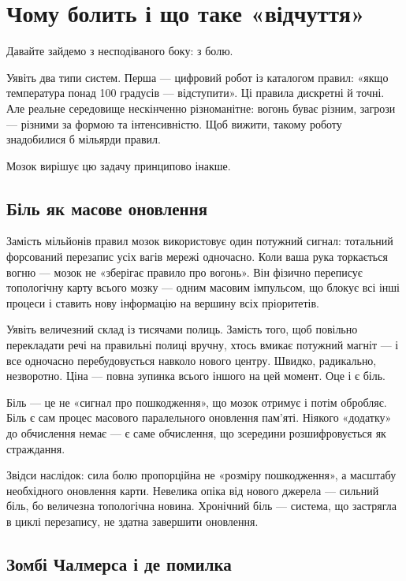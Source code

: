 \documentclass[12pt, a4paper, openany]{book}
\begin{document}
\chapter{Чому болить і що таке «відчуття»}

Давайте зайдемо з несподіваного боку: з болю.

Уявіть два типи систем. Перша --- цифровий робот із каталогом правил: «якщо температура понад 100 градусів --- відступити». Ці правила дискретні й точні. Але реальне середовище нескінченно різноманітне: вогонь буває різним, загрози --- різними за формою та інтенсивністю. Щоб вижити, такому роботу знадобилися б мільярди правил.

Мозок вирішує цю задачу принципово інакше.

\section{Біль як масове оновлення}

Замість мільйонів правил мозок використовує один потужний сигнал: тотальний форсований перезапис усіх вагів мережі одночасно. Коли ваша рука торкається вогню --- мозок не «зберігає правило про вогонь». Він фізично переписує топологічну карту всього мозку --- одним масовим імпульсом, що блокує всі інші процеси і ставить нову інформацію на вершину всіх пріоритетів.

\begin{analogybox}
Уявіть величезний склад із тисячами полиць. Замість того, щоб повільно перекладати речі на правильні полиці вручну, хтось вмикає потужний магніт --- і все одночасно перебудовується навколо нового центру. Швидко, радикально, незворотно. Ціна --- повна зупинка всього іншого на цей момент. Оце і є біль.
\end{analogybox}

Біль --- це не «сигнал про пошкодження», що мозок отримує і потім обробляє. Біль є сам процес масового паралельного оновлення пам'яті. Ніякого «додатку» до обчислення немає --- є саме обчислення, що зсередини розшифровується як страждання.

Звідси наслідок: сила болю пропорційна не «розміру пошкодження», а масштабу необхідного оновлення карти. Невелика опіка від нового джерела --- сильний біль, бо величезна топологічна новина. Хронічний біль --- система, що застрягла в циклі перезапису, не здатна завершити оновлення.

\section{Зомбі Чалмерса і де помилка}
\end{document}
